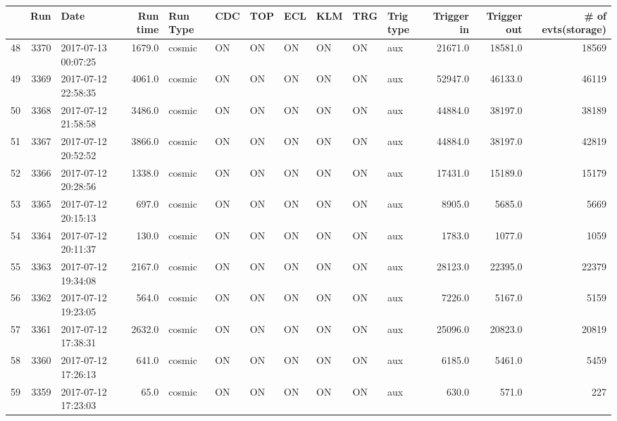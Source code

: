 \begin{longtable}{lrlrlllllllrrr}
\toprule
{} &   Run &                 Date &  Run time & Run Type & CDC &  TOP &  ECL & KLM &  TRG & Trig type &  Trigger in &  Trigger out &  \# of evts(storage) \\
\midrule
48  &  3370 &  2017-07-13 00:07:25 &    1679.0 &   cosmic &  ON &   ON &   ON &  ON &   ON &       aux &     21671.0 &      18581.0 &               18569 \\
49  &  3369 &  2017-07-12 22:58:35 &    4061.0 &   cosmic &  ON &   ON &   ON &  ON &   ON &       aux &     52947.0 &      46133.0 &               46119 \\
50  &  3368 &  2017-07-12 21:58:58 &    3486.0 &   cosmic &  ON &   ON &   ON &  ON &   ON &       aux &     44884.0 &      38197.0 &               38189 \\
51  &  3367 &  2017-07-12 20:52:52 &    3866.0 &   cosmic &  ON &   ON &   ON &  ON &   ON &       aux &     44884.0 &      38197.0 &               42819 \\
52  &  3366 &  2017-07-12 20:28:56 &    1338.0 &   cosmic &  ON &   ON &   ON &  ON &   ON &       aux &     17431.0 &      15189.0 &               15179 \\
53  &  3365 &  2017-07-12 20:15:13 &     697.0 &   cosmic &  ON &   ON &   ON &  ON &   ON &       aux &      8905.0 &       5685.0 &                5669 \\
54  &  3364 &  2017-07-12 20:11:37 &     130.0 &   cosmic &  ON &   ON &   ON &  ON &   ON &       aux &      1783.0 &       1077.0 &                1059 \\
55  &  3363 &  2017-07-12 19:34:08 &    2167.0 &   cosmic &  ON &   ON &   ON &  ON &   ON &       aux &     28123.0 &      22395.0 &               22379 \\
56  &  3362 &  2017-07-12 19:23:05 &     564.0 &   cosmic &  ON &   ON &   ON &  ON &   ON &       aux &      7226.0 &       5167.0 &                5159 \\
57  &  3361 &  2017-07-12 17:38:31 &    2632.0 &   cosmic &  ON &   ON &   ON &  ON &   ON &       aux &     25096.0 &      20823.0 &               20819 \\
58  &  3360 &  2017-07-12 17:26:13 &     641.0 &   cosmic &  ON &   ON &   ON &  ON &   ON &       aux &      6185.0 &       5461.0 &                5459 \\
59  &  3359 &  2017-07-12 17:23:03 &      65.0 &   cosmic &  ON &   ON &   ON &  ON &   ON &       aux &       630.0 &        571.0 &                 227 \\

\end{longtable}
